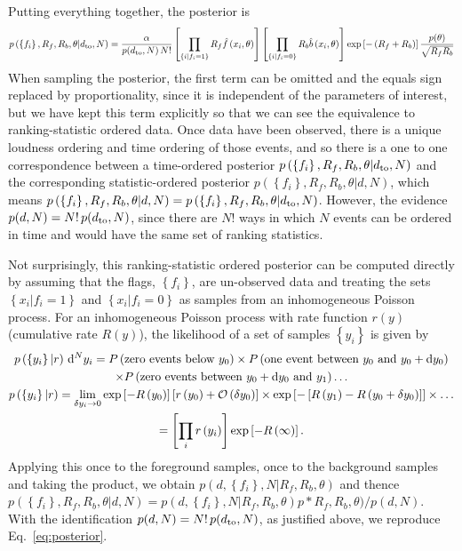 \documentclass[aps,prd]{revtex4-1}
\newcommand{\order}[1]{\mathcal{O}\left( #1 \right)}
\newcommand{\mathset}[1]{\left\{ #1 \right\}}
\begin{document}
Putting everything together, the posterior is
\begin{equation}
  \label{eq:posterior}
  p\left( \mathset{f_i}, R_f, R_b, \theta | d_{\rm to},N \right) =
  \frac{\alpha}{p(d_{\rm to},N)\,N!} \left[ \prod_{\mathset{i | f_i =
        1}} R_f \hat{f}\left(x_i, \theta\right) \right] \left[
    \prod_{\mathset{i | f_i = 0}} R_b \hat{b}\left( x_i, \theta\right)
    \right] \exp\left[ - \left(R_f + R_b\right) \right]
  \frac{p(\theta)}{\sqrt{R_f R_b}}
\end{equation}
When sampling the posterior, the first term can be omitted and the
equals sign replaced by proportionality, since it is independent of
the parameters of interest, but we have kept this term explicitly so
that we can see the equivalence to ranking-statistic ordered
data. Once data have been observed, there is a unique loudness
ordering and time ordering of those events, and so there is a one to
one correspondence between a time-ordered posterior $p\left(
\mathset{f_i}, R_f, R_b, \theta | d_{\rm to},N \right)$ and the
corresponding statistic-ordered posterior $ p\left( \mathset{f_i},
R_f, R_b, \theta | d,N \right)$, which means $p\left( \mathset{f_i},
R_f, R_b, \theta | d,N \right) = p\left( \mathset{f_i}, R_f, R_b,
\theta | d_{\rm to},N \right)$. However, the evidence $p(d,N) =
N!\,p(d_{\rm to},N)$, since there are $N!$ ways in which $N$ events
can be ordered in time and would have the same set of ranking
statistics.

Not surprisingly, this ranking-statistic ordered posterior can be
computed directly by assuming that the flags, $\mathset{f_i}$, are
un-observed data and treating the sets $\mathset{x_i | f_i = 1}$ and
$\mathset{x_i | f_i = 0}$ as samples from an inhomogeneous Poisson
process.  For an inhomogeneous Poisson process with rate function
$r(y)$ (cumulative rate $R(y)$), the likelihood of a set of samples
$\mathset{y_i}$ is given by
\begin{multline}
  p\left( \mathset{y_i} | r \right) \,{\rm d}^Ny_i= P\left(
  \textnormal{zero events below } y_0 \right) \times P\left(
  \textnormal{one event between } y_0 \textnormal{ and } y_0 + {\rm
    d}y_0 \right) \\ \times P\left( \textnormal{zero events between }
  y_0+{\rm d}y_0 \textnormal{ and } y_1 \right) \ldots \\ p\left(
  \mathset{y_i} | r \right) = \lim_{\delta y_i \to 0} \exp\left[ -
    R\left(y_0\right) \right] \left[ r\left( y_0 \right) +
    \order{\delta y_0} \right] \times \exp\left[ - \left[ R\left( y_1
      \right) - R\left( y_0 + \delta y_0\right) \right] \right] \times
  \ldots \\ = \left[\prod_i r\left( y_i \right)\right] \exp\left[ -
    R\left( \infty \right) \right].
\end{multline}
Applying this once to the foreground samples, once to the background
samples and taking the product, we obtain $p(d,\mathset{f_i}, N | R_f,
R_b, \theta)$ and thence $p(\mathset{f_i}, R_f, R_b, \theta | d,N) =
p(d,\mathset{f_i}, N | R_f, R_b, \theta) p*R_f, R_b,
\theta)/p(d,N)$. With the identification $p(d,N) = N!\,p(d_{\rm
  to},N)$, as justified above, we reproduce Eq.~\eqref{eq:posterior}.
\end{document}

